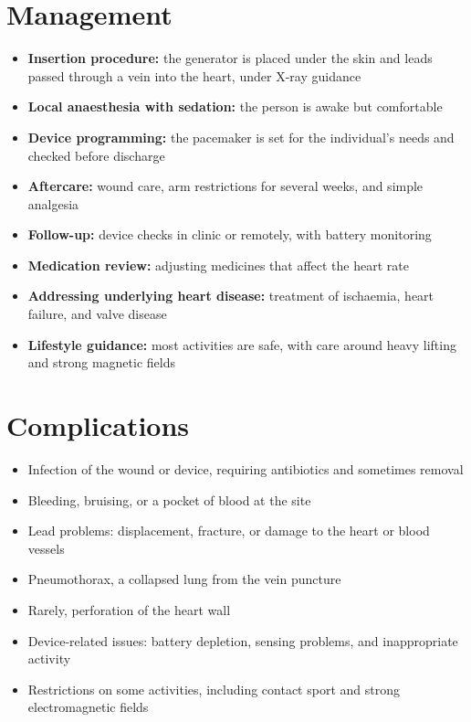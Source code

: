 \section*{Management}
\begin{itemize}
    \item \textbf{Insertion procedure:} the generator is placed under the skin and leads passed through a vein into the heart, under X-ray guidance
    \item \textbf{Local anaesthesia with sedation:} the person is awake but comfortable
    \item \textbf{Device programming:} the pacemaker is set for the individual's needs and checked before discharge
    \item \textbf{Aftercare:} wound care, arm restrictions for several weeks, and simple analgesia
    \item \textbf{Follow-up:} device checks in clinic or remotely, with battery monitoring
    \item \textbf{Medication review:} adjusting medicines that affect the heart rate
    \item \textbf{Addressing underlying heart disease:} treatment of ischaemia, heart failure, and valve disease
    \item \textbf{Lifestyle guidance:} most activities are safe, with care around heavy lifting and strong magnetic fields
\end{itemize}

\section*{Complications}
\begin{itemize}
    \item Infection of the wound or device, requiring antibiotics and sometimes removal
    \item Bleeding, bruising, or a pocket of blood at the site
    \item Lead problems: displacement, fracture, or damage to the heart or blood vessels
    \item Pneumothorax, a collapsed lung from the vein puncture
    \item Rarely, perforation of the heart wall
    \item Device-related issues: battery depletion, sensing problems, and inappropriate activity
    \item Restrictions on some activities, including contact sport and strong electromagnetic fields
\end{itemize}

